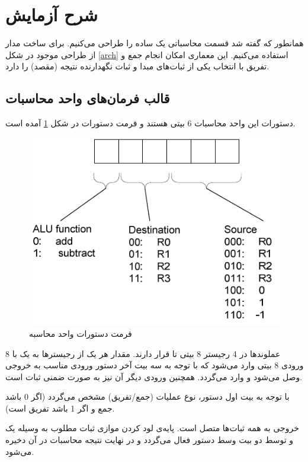 \documentclass[fleqn]{article}
\begin{document}
\section{شرح آزمایش}

همانطور که گفته شد قسمت محاسباتی یک 
ساده را طراحی می‌کنیم. برای ساخت مدار از طراحی موجود در شکل 
\ref{arch}
استفاده می‌کنیم. این معماری امکان انجام جمع و تفریق با انتخاب یکی از ثبات‌های‌ مبدا و ثبات 
نگهدارنده نتیجه (مقصد) را دارد.

\subsection{قالب فرمان‌های واحد محاسبات}

دستورات این واحد محاسبات 6 بیتی هستند و فرمت دستورات در شکل 
\ref{command}
آمده است. 

\begin{figure}[!htbp]
  \includegraphics[width=\textwidth]{Assets/commands.png}
  \caption{فرمت دستورات واحد محاسبه}
  \label{command}
\end{figure}

عملوندها در 4 رجیستر 8 بیتی 
تا 
قرار دارند.
مقدار هر یک از رجیسترها به یک 
با 8 ورودی 8 بیتی وارد می‌شود که با توجه به سه بیت آخر دستور ورودی مناسب به خروجی وصل می‌شود و وارد 
می‌گردد. همچنین ورودی دیگر آن نیز به صورت ضمنی ثبات 
است.

با توجه به بیت اول دستور، نوع عملیات (جمع/تفریق) مشخص می‌گردد (اگر 0 باشد جمع و اگر 1 باشد تفریق است).

خروجی 
به همه ثبات‌ها متصل است. پایه‌ی لود کردن موازی ثبات مطلوب به وسیله یک 
و توسط دو بیت وسط دستور فعال می‌گردد و در نهایت نتیجه محاسبات در آن دخیره می‌شود.
\end{document}
